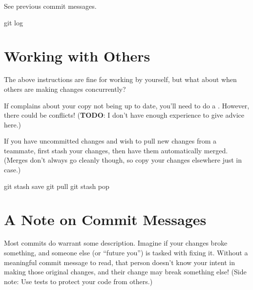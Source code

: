See previous commit messages.
\begin{code}
git log
\end{code}

\section{Working with Others}
The above instructions are fine for working by yourself, but what about when others are making changes concurrently?

If  complains about your copy not being up to date, you'll need to do a .
However, there could be conflicts!
(\textbf{TODO}: I don't have enough experience to give advice here.)

If you have uncommitted changes and wish to pull new changes from a teammate, first stash your changes, then have them automatically merged.
(Merges don't always go cleanly though, so copy your changes elsewhere just in case.)
\begin{code}
git stash save
git pull
git stash pop
\end{code}

\section{A Note on Commit Messages}
Most commits do warrant some description.
Imagine if your changes broke something, and someone else (or ``future you'') is tasked with fixing it.
Without a meaningful commit message to read, that person doesn't know your intent in making those original changes, and their change may break something else!
(Side note: Use tests to protect your code from others.)

